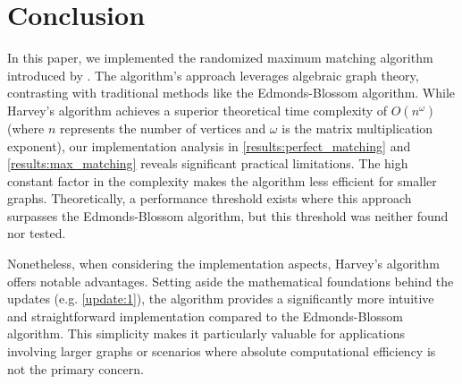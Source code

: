 \chapter{Conclusion}

In this paper, we implemented the randomized maximum matching algorithm introduced by \citet{Harvey:Paper}. 
The algorithm's approach leverages algebraic graph theory, contrasting with traditional methods like the Edmonds-Blossom \cite{Edmonds} algorithm. 
While Harvey's algorithm achieves a superior theoretical time complexity of $O(n^\omega)$ (where $n$ represents the number of vertices and $\omega$ is the matrix multiplication exponent), our implementation analysis in \cref{results:perfect_matching} and \cref{results:max_matching} reveals significant practical limitations. 
The high constant factor in the complexity makes the algorithm less efficient for smaller graphs.
Theoretically, a performance threshold exists where this approach surpasses the Edmonds-Blossom algorithm, but this threshold was neither found nor tested.

Nonetheless, when considering the implementation aspects, Harvey's algorithm offers notable advantages. 
Setting aside the mathematical foundations behind the updates (e.g. \cref{update:1}), the algorithm provides a significantly more intuitive and straightforward implementation compared to the Edmonds-Blossom algorithm. 
This simplicity makes it particularly valuable for applications involving larger graphs or scenarios where absolute computational efficiency is not the primary concern.
